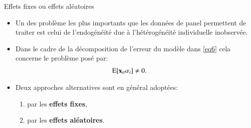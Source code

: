 \begin{frame}[allowframebreaks]{Effets fixes ou effets aléatoires}
\begin{itemize}
    \item Un des problème les plus importants que les données de panel 
    permettent de traiter est celui de l'endogénéité due à l'hétérogénéité individuelle inobservée. 
    \item Dans le cadre de la décomposition de l'erreur du modèle dans \eqref{eq6} cela concerne 
    le problème posé par:
    \begin{align*}
        \operatorname{E}[{\mathbf x}_{it}\alpha_i]&\neq 0.
    \end{align*}
    \item Deux approches alternatives sont en général adoptées:
    \begin{enumerate}
        \item par les \textbf{effets fixes},
        \item par les \textbf{effets aléatoires}.
    \end{enumerate}
\end{itemize}
\end{frame}


